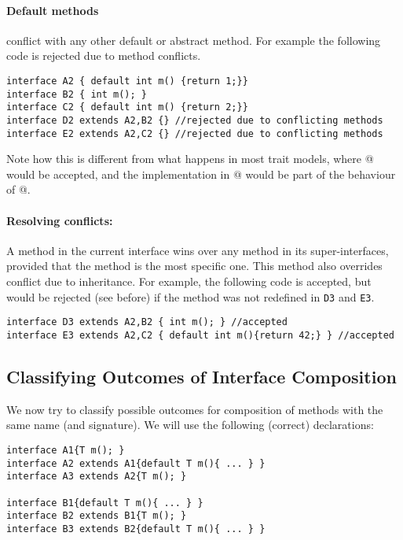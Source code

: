 \paragraph{Default methods} conflict with any other default or abstract method. For
  example the following code is rejected due to method conflicts.
\begin{lstlisting}
interface A2 { default int m() {return 1;}}
interface B2 { int m(); }
interface C2 { default int m() {return 2;}}
interface D2 extends A2,B2 {} //rejected due to conflicting methods
interface E2 extends A2,C2 {} //rejected due to conflicting methods
\end{lstlisting}
Note how this is different from what happens in most trait models, where @
would be accepted, and the implementation in @ would be part of the
behaviour of @.

\paragraph{Resolving conflicts:}
A method in the current interface wins over any method in its
super-interfaces, provided that the method
is the most specific one. This method also overrides conflict due to
inheritance. For example, the following code is accepted, but would be rejected
(see before) if the method \Q@m@ was not redefined in \texttt{D3} and
\texttt{E3}.
\begin{lstlisting}
interface D3 extends A2,B2 { int m(); } //accepted
interface E3 extends A2,C2 { default int m(){return 42;} } //accepted
\end{lstlisting}

\subsection{Classifying Outcomes of Interface Composition}
%
We now try to classify possible outcomes for composition of methods with the same name (and
signature).
We will use the following (correct) declarations:
\begin{lstlisting}
interface A1{T m(); }
interface A2 extends A1{default T m(){ ... } }
interface A3 extends A2{T m(); }

interface B1{default T m(){ ... } }
interface B2 extends B1{T m(); }
interface B3 extends B2{default T m(){ ... } }
\end{lstlisting}

